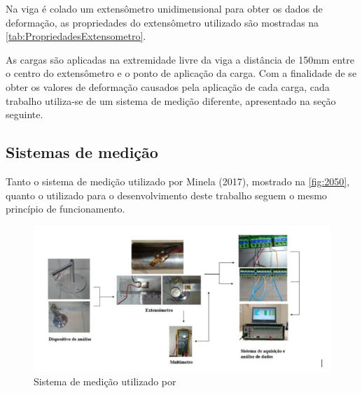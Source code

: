 Na viga é colado um extensômetro unidimensional para obter os dados de deformação, as propriedades do extensômetro utilizado são mostradas na
\autoref{tab:PropriedadesExtensometro}.

\begin{table}[htb]
\caption{Propriedades do extensômetro colado ao dispositivo de flexão}
\label{tab:PropriedadesExtensometro}
\end{table}

As cargas são aplicadas na extremidade livre da viga a distância de 150mm entre o centro do extensômetro e o ponto de aplicação da carga.
Com a finalidade de se obter os valores de deformação causados pela aplicação de cada carga, cada trabalho utiliza-se de um sistema de medição diferente, apresentado
na seção seguinte.

\subsection{Sistemas de medição}

Tanto o sistema de medição utilizado por Minela (2017), mostrado na \autoref{fig:2050}, quanto o utilizado para o desenvolvimento deste trabalho seguem o mesmo princípio de funcionamento.

\begin{figure}[htb]
	\caption{\label{fig:2050} Sistema de medição utilizado por \autocite{Minela2017}}
	\begin{center}
		\includegraphics[width=\textwidth]{pictures/2050.png}
	\end{center}
\end{figure}

